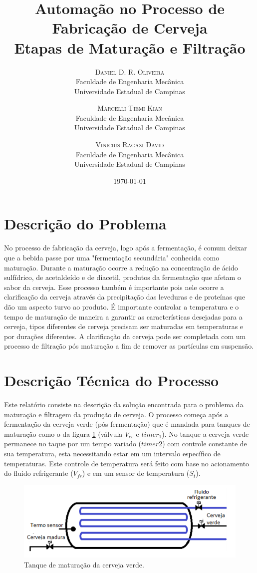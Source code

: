 \documentclass[twoside,twocolumn, 12pt]{paper}
\title{Automação no Processo de Fabricação de Cerveja\\ 
	\large Etapas de Maturação e Filtração} %
\author{%
	\textsc{Daniel D. R. Oliveira}\\[1ex]
	\normalsize Faculdade de Engenharia Mecânica\\
	\normalsize Universidade Estadual de Campinas\\
	\and
	\textsc{Marcelli Tiemi Kian}\\[1ex]
	\normalsize Faculdade de Engenharia Mecânica\\
	\normalsize Universidade Estadual de Campinas\\
	\and
	\textsc{Vinicius Ragazi David}\\[1ex]
	\normalsize Faculdade de Engenharia Mecânica\\
	\normalsize Universidade Estadual de Campinas\\
}
\date{\today} %
\begin{document}
	
	\maketitle
	
	\section{Descrição do Problema}
	No processo de fabricação da cerveja, logo após a fermentação, é comum deixar que a bebida passe por uma "fermentação secundária" conhecida como maturação. Durante a maturação ocorre a redução na concentração de ácido sulfídrico, de acetaldeído e de diacetil, produtos da fermentação que afetam o sabor da cerveja. Esse processo também é importante pois nele ocorre a clarificação da cerveja através da precipitação das leveduras e de proteínas que dão um aspecto turvo ao produto. É importante controlar a temperatura e o tempo de maturação de maneira a garantir as características desejadas para a cerveja, tipos diferentes de cerveja precisam ser maturadas em temperaturas e por durações diferentes. A clarificação da cerveja pode ser completada com um processo de filtração pós maturação a fim de remover as partículas em suspensão.
	
	\section{Descrição Técnica do Processo}
	
	Este relatório consiste na descrição da solução encontrada para o problema da maturação e filtragem da produção de cerveja. O processo começa após a fermentação da cerveja verde (pós fermentação) que é mandada para tanques de maturação como o da figura \ref{fig:maturador} (válvula $V_{cv}$ e $timer_1$). No tanque a cerveja verde permanece no taque por um tempo variado ($timer2$) com controle constante de sua temperatura, esta necessitando estar em um intervalo específico de temperaturas. Este controle de temperatura será feito com base no acionamento do fluido refrigerante ($V_{fr}$) e em um sensor de temperatura ($S_t$).
	
	\begin{figure}
		\centering
		\includegraphics [width=\columnwidth]{tanque.png}
		\caption {Tanque de maturação da cerveja verde.}
		\label{fig:maturador}
	\end{figure}
	
\end{document}

